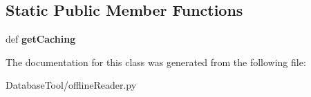 \subsection*{Static Public Member Functions}
\begin{DoxyCompactItemize}
\item 
\mbox{\label{classMIS_1_1DatabaseTool_1_1offlineReader_1_1Cormis__DataReader__offline_a39f13bf96d40a689fbd1f62dcde82e65}} 
def {\bfseries get\+Caching}
\end{DoxyCompactItemize}


The documentation for this class was generated from the following file\+:\begin{DoxyCompactItemize}
\item 
Database\+Tool/offline\+Reader.\+py\end{DoxyCompactItemize}

